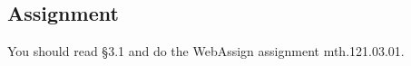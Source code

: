 \documentclass[12pt,addpoints, answers, fleqn]{exam}
\begin{document}
%
%
%
%
%
%
%
%
%
%
% 
%
%
%











\subsection{Assignment}
You should read \S  3.1 and do the WebAssign assignment mth.121.03.01.
\vfill
\pagebreak
\end{document}
